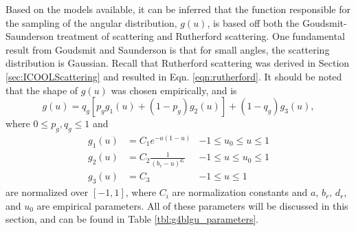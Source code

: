 Based on the models available, it can be inferred that the function responsible for the sampling of the angular distribution, $g(u)$, is based off both the Goudsmit-Saunderson treatment of scattering \cite{gs} and Rutherford scattering. One fundamental result from Goudsmit and Saunderson is that for small angles, the scattering distribution is Gaussian. Recall that Rutherford scattering was derived in Section \ref{sec:ICOOLScattering} and resulted in Eqn. \ref{eqn:rutherford}. It should be noted that the shape of $g(u)$ was chosen empirically, and is
%
\begin{equation}\label{eqn:g4blgu}
g(u)=q_g\left[p_g g_1(u)+(1-p_g)g_2(u)\right]+(1-q_g)g_3(u),
\end{equation}
%
where $0\leq p_g,q_g\leq 1$ and
%
\begin{align*}\nonumber
g_1(u)&=C_1e^{-a(1-u)} & -1\le u_0\le u\le 1\\
g_2(u)&=C_2\frac{1}{(b_r-u)^{d_r}} & -1\le u\le u_0\le 1\\
g_3(u)&=C_3 & -1\le u \le 1
\end{align*}
%
are normalized over $[-1,1]$, where $C_i$ are normalization constants and $a$, $b_r$, $d_r$, and $u_0$ are empirical parameters. All of these parameters will be discussed in this section, and can be found in Table \ref{tbl:g4blgu_parameters}. 

